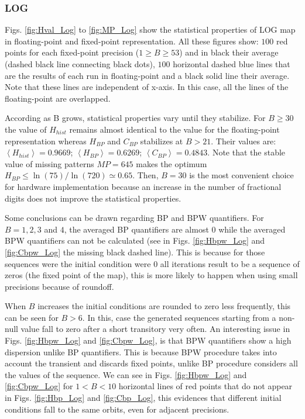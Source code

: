 \subsubsection{LOG} \label{subsubsec:log}

Figs. \ref{fig:Hval_Log} to \ref{fig:MP_Log} show the statistical properties of LOG map in floating-point and fixed-point representation.
All these figures show: $100$ red points for each fixed-point precision ($1\geq B \geq 53$) and in black their average (dashed black line connecting black dots), $100$ horizontal dashed blue lines that are the results of each run in floating-point and a black solid line their average.
Note that these lines are independent of x-axis.
In this case, all the lines of the floating-point are overlapped.

According as B grows, statistical properties vary until they stabilize.
For $B\geq 30$ the value of $H_{hist}$ remains almost identical to the value for the floating-point representation whereas $H_{BP}$ and $C_{BP}$ stabilizes at $B>21$.
Their values are: $\left\langle H_{hist}\right\rangle =0.9669$; $\left\langle H_{BP}\right\rangle =0.6269$; $\left\langle C_{BP}\right\rangle=0.4843$.
Note that the stable value of missing patterns $MP=645$ makes the optimum $H_{BP} \leq \ln(75)/\ln(720) \simeq 0.65$.
Then, $B=30$ is the most convenient choice for hardware implementation because an increase in the number of fractional digits does not improve the statistical properties.

Some conclusions can be drawn regarding BP and BPW quantifiers.
For $B=1, 2, 3$ and $4$, the averaged BP quantifiers are almost $0$ while the averaged BPW quantifiers can not be calculated (see in Figs. \ref{fig:Hbpw_Log} and \ref{fig:Cbpw_Log} the missing black dashed line).
This is because for those sequences were the initial condition were $0$ all iterations result to be a sequence of zeros (the fixed point of the map), this is more likely to happen when using small precisions because of roundoff.

When $B$ increases the initial conditions are rounded to zero less frequently, this can be seen for $B>6$.
In this, case the generated sequences starting from a non-null value fall to zero after a short transitory very often.
An interesting issue in Figs. \ref{fig:Hbpw_Log} and \ref{fig:Cbpw_Log}, is that BPW quantifiers show a high dispersion unlike BP quantifiers.
This is because BPW procedure takes into account the transient and discards fixed points, unlike BP procedure considers all the values of the sequence.
We can see in Figs. \ref{fig:Hbpw_Log} and \ref{fig:Cbpw_Log} for $1<B<10$ horizontal lines of red points that do not appear in Figs. \ref{fig:Hbp_Log} and \ref{fig:Cbp_Log}, this evidences that different initial conditions fall to the same orbits, even for adjacent precisions.

